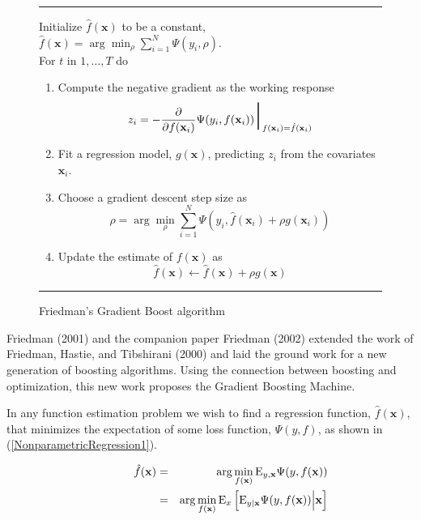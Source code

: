 \documentclass{article}
\newcommand{\EV}{\mathrm{E}}
\newcommand{\aRule}{\begin{center} \rule{5in}{1mm} \end{center}}
\begin{document}
\begin{figure} 
\aRule Initialize $\hat f(\mathbf{x})$ to be a constant, $\hat f(\mathbf{x}) = \arg \min_{\rho} \sum_{i=1}^N \Psi(y_i,\rho)$. \\ 
For $t$ in $1,\ldots,T$ do 
\begin{enumerate} 
\item Compute the negative gradient as the working response
    \begin{equation}
    z_i = -\frac{\partial}{\partial f(\mathbf{x}_i)} \Psi(y_i,f(\mathbf{x}_i)) \mbox{\Huge $|$}_{f(\mathbf{x}_i)=\hat f(\mathbf{x}_i)}
    \end{equation}
\item Fit a regression model, $g(\mathbf{x})$, predicting $z_i$ from the covariates $\mathbf{x}_i$. \item Choose a gradient descent step size as
    \begin{equation}
    \rho = \arg \min_{\rho} \sum_{i=1}^N \Psi(y_i,\hat f(\mathbf{x}_i)+\rho g(\mathbf{x}_i))
    \end{equation}
\item Update the estimate of $f(\mathbf{x})$ as
    \begin{equation}
    \hat f(\mathbf{x}) \leftarrow \hat f(\mathbf{x}) + \rho g(\mathbf{x})
    \end{equation}
\end{enumerate} \aRule \caption{Friedman's Gradient Boost algorithm} \label{fig:GradientBoost} \end{figure}

Friedman (2001) and the companion paper Friedman (2002) extended the work of Friedman, Hastie, and Tibshirani (2000) and laid the ground work for a new generation of boosting algorithms. Using the connection between boosting and optimization, this new work proposes the Gradient Boosting Machine.

In any function estimation problem we wish to find a regression function, $\hat f(\mathbf{x})$, that minimizes the expectation of some loss function, $\Psi(y,f)$, as shown in (\ref{NonparametricRegression1}).

\begin{eqnarray}
\hspace{0.5in}
\hat f(\mathbf{x}) &=& \arg \min_{f(\mathbf{x})} \EV_{y,\mathbf{x}} \Psi(y,f(\mathbf{x})) \nonumber \\ \label{NonparametricRegression1}
&=& \arg \min_{f(\mathbf{x})} \EV_x \left[ \EV_{y|\mathbf{x}} \Psi(y,f(\mathbf{x})) \Big| \mathbf{x} \right]
\end{eqnarray}
\end{document}
